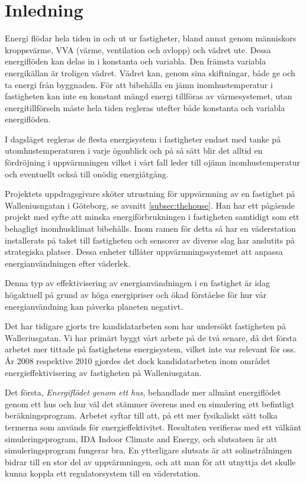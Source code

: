 \chapter{Inledning}

Energi flödar hela tiden in och ut ur fastigheter, bland annat genom människors kroppsvärme, VVA (värme, ventilation och avlopp) och vädret ute. Dessa energiflöden kan delas in i konstanta och variabla. Den främsta variabla energikällan är troligen vädret. Vädret kan, genom sina skiftningar, både ge och ta energi från byggnaden. För att bibehålla en jämn inomhustemperatur i fastigheten kan inte en konstant mängd energi tillföras av värmesystemet, utan energitillförseln måste hela tiden regleras utefter både konstanta och variabla energiflöden.

I dagsläget regleras de flesta energisystem i fastigheter endast med tanke på utomhustemperaturen i varje ögonblick och på så sätt blir det alltid en fördröjning i uppvärmningen vilket i vårt fall leder till ojämn inomhustemperatur och eventuellt också till onödig energiåtgång.

Projektets uppdragsgivare sköter utrustning för uppvärmning av en fastighet på Walleniusngatan i Göteborg, se avsnitt \ref{subsec:thehouse}. Han har ett pågående projekt med syfte att minska energiförbrukningen i fastigheten samtidigt som ett behagligt inomhusklimat bibehålls. Inom ramen för detta så har en väderstation installerats på taket till fastigheten och sensorer av diverse slag har anslutits på strategiska platser.  Dessa enheter tillåter uppvärmningssystemet att anpassa energianvändningen efter väderlek.

Denna typ av effektivisering av energianvändningen i en fastighet är idag högaktuell på grund av höga energipriser och ökad förståelse för hur vår energianvändning kan påverka planeten negativt.

Det har tidigare gjorts tre kandidatarbeten som har undersökt fastigheten på Walleriusgatan. Vi har primärt byggt vårt arbete på de två senare, då det första arbetet mer tittade på fastighetens energisystem, vilket inte var relevant för oss. År 2008 respektive 2010 gjordes det dock kandidatarbeten inom området energieffektivisering av fastigheten på Walleniusgatan. 

Det första, \textit{Energiflödet genom ett hus}\cite{kandidatarbete2008}, behandlade mer allmänt energiflödet genom ett hus och hur väl det stämmer överens med en simulering ett befintligt beräkningsprogram. Arbetet syftar till att, på ett mer fysikaliskt sätt tolka termerna som används för energieffektivitet. Resultaten verifieras med ett välkänt simuleringsprogram, IDA Indoor Climate and Energy, och slutsatsen är att simuleringsprogram fungerar bra. En ytterligare slutsats är att solinstrålningen bidrar till en stor del av uppvärmningen, och att man för att utnyttja det skulle kunna koppla ett regulatorsystem till en väderstation.

